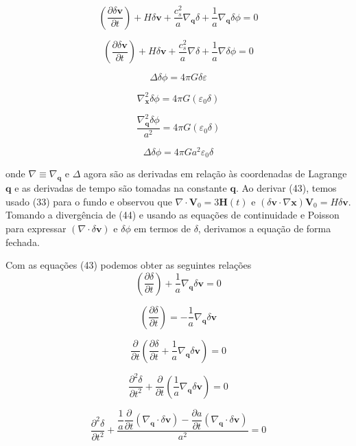 \documentclass[a4paper,12pt]{article}
\begin{document}
$$\left( \dfrac{\partial\delta\mathbf{v}}{\partial t} \right) +H\delta\mathbf{v} + \dfrac{c^2_s}{a}\nabla_\mathbf{q}\delta + \dfrac{1}{a}\nabla_\mathbf{q}\delta\phi = 0$$

\begin{equation}
	\left( \dfrac{\partial \delta\mathbf{v}}{\partial t} \right) +H\delta\mathbf{v}+\dfrac{c^2_s}{a}\nabla\delta + \dfrac{1}{a}\nabla\delta\phi =0
\end{equation}
\newline


$$\Delta\delta\phi = 4\pi G\delta\varepsilon$$

$$\nabla^2_\mathbf{x}\delta\phi = 4\pi G(\varepsilon_0\delta)$$

$$\dfrac{\nabla^2_\mathbf{q}\delta\phi}{a^2} = 4\pi G(\varepsilon_0\delta)$$

\begin{equation}
	\Delta\delta\phi = 4\pi Ga^2\varepsilon_0\delta
\end{equation}

onde $\nabla\equiv\nabla_\mathbf{q}$ e $\Delta$ agora são as derivadas em relação às coordenadas de Lagrange $\mathbf{q}$ e as derivadas de tempo são tomadas na constante $\mathbf{q}$. Ao derivar (43), temos usado (33) para o fundo e observou que $\nabla\cdot\mathbf{V}_0 = 3\mathbf{H}(t)$ e $(\delta\mathbf{v}\cdot\nabla\mathbf{x}) \mathbf{V}_0 = H\delta\mathbf{v}$.
Tomando a divergência de (44) e usando as equações de continuidade e Poisson para
expressar $(\nabla\cdot\delta\mathbf{v})$ e $\delta\phi$ em termos de $\delta$, derivamos a equação de forma fechada.

Com as equações (43) podemos obter as seguintes relações
$$\left( \dfrac{\partial \delta}{\partial t} \right) + \dfrac{1}{a}\nabla_\mathbf{q}\delta\mathbf{v} = 0$$

$$\left( \dfrac{\partial \delta}{\partial t} \right)   = -\dfrac{1}{a}\nabla_\mathbf{q}\delta\mathbf{v}$$
\newline

$$\dfrac{\partial}{\partial t}\left( \dfrac{\partial \delta}{\partial t}  + \dfrac{1}{a}\nabla_\mathbf{q}\delta\mathbf{v} \right)= 0$$

$$\dfrac{\partial^2 \delta}{\partial t^2} + \dfrac{\partial}{\partial t}\left( \dfrac{1}{a}\nabla_\mathbf{q}\delta\mathbf{v} \right)= 0$$

$$\dfrac{\partial^2 \delta}{\partial t^2} + \dfrac{ \dfrac{1}{a}\dfrac{\partial}{\partial t }(\nabla_\mathbf{q}\cdot\delta\mathbf{v})- \dfrac{\partial a}{\partial t}(\nabla_\mathbf{q}\cdot\delta\mathbf{v})}{a^2} = 0$$
\end{document}
